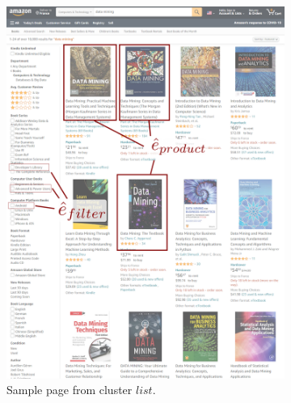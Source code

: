 \documentclass[sigconf,authordraft]{acmart}
\theoremstyle{definition}
\begin{document}
\begin{figure}[ht]
  \centering
  \begin{subfigure}{.35\textwidth}
    \includegraphics[width=\linewidth]{amazon_a.png}
    \caption{Sample page from cluster $list$.}
    \label{fig:amazon_a}
  \end{subfigure}
  \hspace{.1\textwidth}
  \begin{subfigure}{.35\textwidth}

\end{subfigure}
\end{figure}
\end{document}
